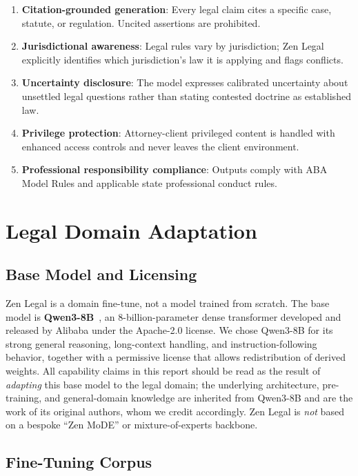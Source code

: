 \documentclass[11pt,a4paper]{article}
\begin{document}
\begin{enumerate}
  \item \textbf{Citation-grounded generation}: Every legal claim cites a specific case, statute, or regulation. Uncited assertions are prohibited.
  \item \textbf{Jurisdictional awareness}: Legal rules vary by jurisdiction; Zen Legal explicitly identifies which jurisdiction's law it is applying and flags conflicts.
  \item \textbf{Uncertainty disclosure}: The model expresses calibrated uncertainty about unsettled legal questions rather than stating contested doctrine as established law.
  \item \textbf{Privilege protection}: Attorney-client privileged content is handled with enhanced access controls and never leaves the client environment.
  \item \textbf{Professional responsibility compliance}: Outputs comply with ABA Model Rules and applicable state professional conduct rules.
\end{enumerate}

\section{Legal Domain Adaptation}

\subsection{Base Model and Licensing}

Zen Legal is a domain fine-tune, not a model trained from scratch. The base model is \textbf{Qwen3-8B}~\cite{qwen3}, an 8-billion-parameter dense transformer developed and released by Alibaba under the Apache-2.0 license. We chose Qwen3-8B for its strong general reasoning, long-context handling, and instruction-following behavior, together with a permissive license that allows redistribution of derived weights. All capability claims in this report should be read as the result of \emph{adapting} this base model to the legal domain; the underlying architecture, pre-training, and general-domain knowledge are inherited from Qwen3-8B and are the work of its original authors, whom we credit accordingly. Zen Legal is \emph{not} based on a bespoke ``Zen MoDE'' or mixture-of-experts backbone.

\subsection{Fine-Tuning Corpus}
\end{document}
